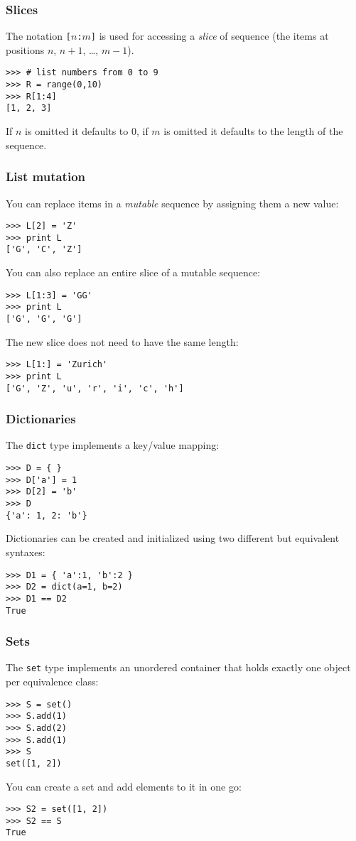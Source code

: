 \documentclass[english,serif,mathserif,xcolor=pdftex,dvipsnames,table]{beamer}
\begin{document}
\begin{frame}[fragile]
  \frametitle{Slices}
  The notation \texttt{[$n$:$m$]} is used for accessing a \emph{slice}
  of sequence (the items at positions $n$, $n+1$, \ldots, $m-1$).
\begin{lstlisting}
>>> # list numbers from 0 to 9
>>> R = range(0,10)
>>> R[1:4]
[1, 2, 3]
\end{lstlisting}

  \+
  If $n$ is omitted it defaults to 0, if $m$ is omitted it defaults to
  the length of the sequence.
\end{frame}


\begin{frame}[fragile]
  \frametitle{List mutation}
  You can replace items in a \emph{mutable} sequence by assigning them
  a new value:
\begin{lstlisting}
>>> L[2] = 'Z'
>>> print L
['G', 'C', 'Z']
\end{lstlisting}

  You can also replace an entire slice of a mutable sequence:
\begin{lstlisting}
>>> L[1:3] = 'GG'
>>> print L
['G', 'G', 'G']
\end{lstlisting}
  The new slice does not need to have the same length:
\begin{lstlisting}
>>> L[1:] = 'Zurich'
>>> print L
['G', 'Z', 'u', 'r', 'i', 'c', 'h']
\end{lstlisting}
\end{frame}


\begin{frame}[fragile]
  \frametitle{Dictionaries}
  The \texttt{dict} type implements a key/value mapping:
\begin{lstlisting}
>>> D = { }
>>> D['a'] = 1
>>> D[2] = 'b'
>>> D
{'a': 1, 2: 'b'}
\end{lstlisting}

  \+
  Dictionaries can be created and initialized using two
  different but equivalent syntaxes:
\begin{lstlisting}
>>> D1 = { 'a':1, 'b':2 }
>>> D2 = dict(a=1, b=2)
>>> D1 == D2
True
\end{lstlisting}
\end{frame}


\begin{frame}[fragile]
  \frametitle{Sets}
  The \texttt{set} type implements an unordered container that holds
  exactly one object per equivalence class:
\begin{lstlisting}
>>> S = set()
>>> S.add(1)
>>> S.add(2)
>>> S.add(1)
>>> S
set([1, 2])
\end{lstlisting}

  \+
  You can create a set and add elements to it in one go:
\begin{lstlisting}
>>> S2 = set([1, 2])
>>> S2 == S
True
\end{lstlisting}
\end{frame}
\end{document}
